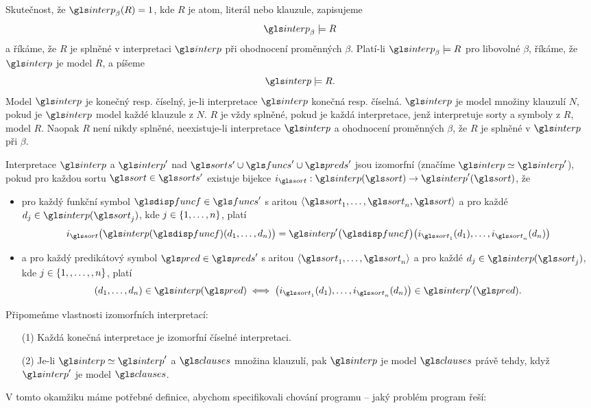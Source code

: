 Skutečnost, že $\interp_\beta(R) = 1$, kde $R$ je atom, literál nebo klauzule,
zapisujeme
\[
\interp_\beta \models R
\]
a říkáme, že $R$ je splněné v interpretaci $\interp$ při ohodnocení
proměnných $\beta$.
Platí-li $\interp_\beta \models R$ pro libovolné $\beta$, říkáme,
že $\interp$ je model $R$, a píšeme
\[
\interp \models R.
\]
Model $\interp$ je konečný resp. číselný, je-li interpretace
$\interp$ konečná resp. číselná.
$\interp$ je model množiny klauzulí $N$,
pokud je $\interp$ model každé klauzule z $N$.
$R$ je vždy splněné, pokud je každá interpretace,
jenž interpretuje sorty a symboly z $R$,
model $R$. Naopak $R$ není nikdy splněné,
neexistuje-li interpretace
$\interp$ a ohodnocení proměnných $\beta$,
že $R$ je splněné v $\interp$ při $\beta$.

Interpretace $\interp$ a $\interp'$ nad
$\sorts' \cup \funcs' \cup \preds'$ jsou izomorfní
(značíme $\interp \simeq \interp'$), pokud pro každou
sortu $\sort \in \sorts'$ existuje bijekce
$i_\sort: \interp(\sort) \to \interp'(\sort)$, že
\begin{itemize}
\item pro každý funkční symbol $\func \in \funcs'$ s aritou
  $\langle \sort_1 \comdots \sort_n, \sort \rangle$
  a pro každé $d_j \in \interp(\sort_j)$,
  kde $j \in \{ 1 , \ldots, n \}$, platí
  \[
     i_\sort\bigl(\interp(\func)(d_1 \comdots d_n)\bigr) =
     \interp'\bigl(\func\bigr)\bigl(i_{\sort_1}(d_1) \comdots
       i_{\sort_n}(d_n)\bigr)
  \]
\item a pro každý predikátový symbol $\pred \in \preds'$ s aritou
  $\langle \sort_1 \comdots \sort_n \rangle$
  a pro každé $d_j \in \interp(\sort_j)$,
  kde $j \in \{ 1, , \ldots,, n \}$, platí
  \[
     (d_1 \comdots d_n) \in \interp(\pred) \iff
     \bigl(i_{\sort_1}(d_1) \comdots i_{\sort_n}(d_n)\bigr) \in \interp'(\pred).
  \]
\end{itemize}

Připomeňme vlastnosti izomorfních interpretací:
\begin{itemize}
\item[(1)] Každá konečná interpretace je izomorfní číselné interpretaci.
\item[(2)] Je-li $\interp \simeq \interp'$ a $\clauses$ množina klauzulí,
  pak $\interp$ je model $\clauses$ právě tehdy,
  když $\interp'$ je model $\clauses$.
\end{itemize}

V tomto okamžiku máme potřebné definice,
abychom specifikovali chování programu -- jaký problém program řeší:

